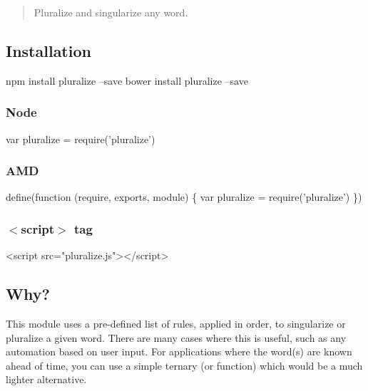 \href{https://npmjs.org/package/pluralize}{\tt } \href{https://npmjs.org/package/pluralize}{\tt } \href{https://travis-ci.org/blakeembrey/pluralize}{\tt } \href{https://coveralls.io/r/blakeembrey/pluralize?branch=master}{\tt }

\begin{quote}
Pluralize and singularize any word. \end{quote}


\subsection*{Installation}


\begin{DoxyCode}
npm install pluralize --save
bower install pluralize --save
\end{DoxyCode}


\subsubsection*{Node}


\begin{DoxyCode}
var pluralize = require('pluralize')
\end{DoxyCode}


\subsubsection*{A\+MD}


\begin{DoxyCode}
define(function (require, exports, module) \{
  var pluralize = require('pluralize')
\})
\end{DoxyCode}


\subsubsection*{{\ttfamily $<$script$>$} tag}


\begin{DoxyCode}
<script src="pluralize.js"></script>
\end{DoxyCode}


\subsection*{Why?}

This module uses a pre-\/defined list of rules, applied in order, to singularize or pluralize a given word. There are many cases where this is useful, such as any automation based on user input. For applications where the word(s) are known ahead of time, you can use a simple ternary (or function) which would be a much lighter alternative.

